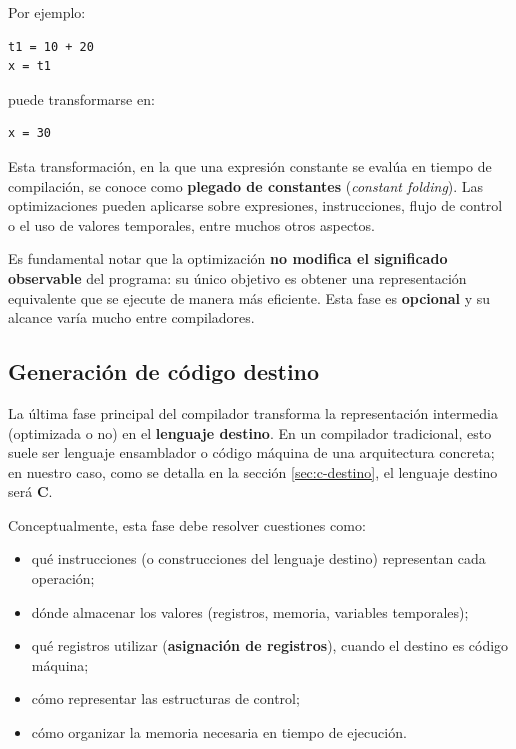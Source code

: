 \documentclass[11pt,a4paper]{article}
\begin{document}
Por ejemplo:

\begin{lstlisting}
t1 = 10 + 20
x = t1
\end{lstlisting}

puede transformarse en:

\begin{lstlisting}
x = 30
\end{lstlisting}

Esta transformación, en la que una expresión constante se evalúa en tiempo de compilación, se
conoce como \textbf{plegado de constantes} (\textit{constant folding}). Las optimizaciones
pueden aplicarse sobre expresiones, instrucciones, flujo de control o el uso de valores
temporales, entre muchos otros aspectos.

Es fundamental notar que la optimización \textbf{no modifica el significado observable} del
programa: su único objetivo es obtener una representación equivalente que se ejecute de manera
más eficiente. Esta fase es \textbf{opcional} y su alcance varía mucho entre compiladores.

\subsection{Generación de código destino}
\label{sec:generacion-codigo}

La última fase principal del compilador transforma la representación intermedia (optimizada o
no) en el \textbf{lenguaje destino}. En un compilador tradicional, esto suele ser lenguaje
ensamblador o código máquina de una arquitectura concreta; en nuestro caso, como se detalla en
la sección \ref{sec:c-destino}, el lenguaje destino será \textbf{C}.

Conceptualmente, esta fase debe resolver cuestiones como:

\begin{itemize}
    \item qué instrucciones (o construcciones del lenguaje destino) representan cada operación;
    \item dónde almacenar los valores (registros, memoria, variables temporales);
    \item qué registros utilizar (\textbf{asignación de registros}), cuando el destino es
    código máquina;
    \item cómo representar las estructuras de control;
    \item cómo organizar la memoria necesaria en tiempo de ejecución.
\end{itemize}
\end{document}
